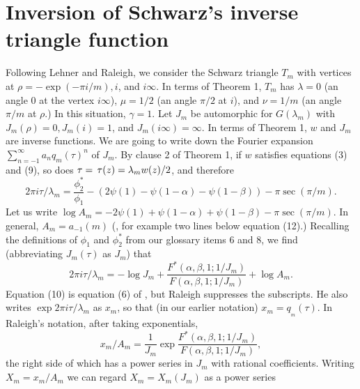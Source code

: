\documentclass{article}
\begin{document}
\section[]{Inversion of Schwarz's 
inverse triangle function}
Following Lehner and Raleigh,
we consider the Schwarz triangle
$T_m$ with vertices at 
$\rho = -\exp(-\pi i/m), i$,
and $i\infty$. 
In terms of
Theorem 1,
$T_m$ has
$\lambda = 0$
(an angle $0$ at 
the vertex $i\infty$), $\mu = 1/2$
(an angle $\pi/2$ at $i$),
and $\nu = 1/m$ (an angle $\pi/m$
at $\rho$.)
 In this situation, $\gamma = 1$. 
 \newline \newline \noindent
 Let $J_m$ be automorphic for 
 $G(\lambda_m)$ with
 $J_m(\rho) = 0, J_m(i) = 1$,
 and $J_m(i \infty) = \infty$.
 In terms of Theorem 1, $w$
 and $J_m$ are inverse functions.
 We are going to write
 down the Fourier expansion
 $\sum_{n = -1}^{\infty} a_n q_m(\tau)^n$
 of $J_m$.
 \newline \newline \noindent
By clause 2 of Theorem 1, if $w$ satisfies 
equations (3) and (9), so does
$\tau = \thinspace \tau(z) = \lambda_m w(z)/2$, 
and therefore
$$
2\pi i\tau /\lambda_m =
 \frac{\phi_2^*}{\phi_1} - \left (2 \psi(1) - 
\psi(1 - \alpha)
- \psi(1-\beta) \right ) - 
\pi  \sec(\pi/m).
$$
Let us write
$\log A_m = -2 \psi(1) + \psi(1 - \alpha)
+ \psi(1 - \beta)  - \pi \sec(\pi/m).$ 
In general, $A_m = a_{-1}(m)$
(\cite{raleigh1962fourier},
for example two lines below equation (12).)
Recalling the definitions of 
$\phi_1$ and $\phi_2^*$
from our glossary items 6 and 8, 
we find (abbreviating $J_m(\tau)$ as $J_m$) that 
\begin{equation}
2\pi i\tau /\lambda_m 
  = - \log J_m
+ \frac {F^*(\alpha, \beta, 1;1/J_m)}
{F(\alpha, \beta, 1;1/J_m)} +  
\log A_m.
\end{equation}
Equation (10) is equation (6) of 
\cite{raleigh1962fourier},
but Raleigh  suppresses the 
subscripts.
He also writes 
$\exp 2 \pi i \tau/\lambda_m$ as $x_m$, 
so that (in our earlier notation)
$x_m = q_{_m}(\tau)$.
\newline \newline \noindent
In Raleigh's notation, after taking
exponentials,
\begin{equation}
 x_m/A_m = 
\frac 1{J_m} \exp 
\frac {F^*(\alpha, \beta, 1;1/J_m)}
{F(\alpha, \beta, 1;1/J_m)},
\end{equation}
the right side of
which has a power series in $J_m$ with
rational coefficients. 
Writing $X_m = x_m/A_m$
we can regard $X_m = X_m(J_m)$ as a power series
\end{document}
